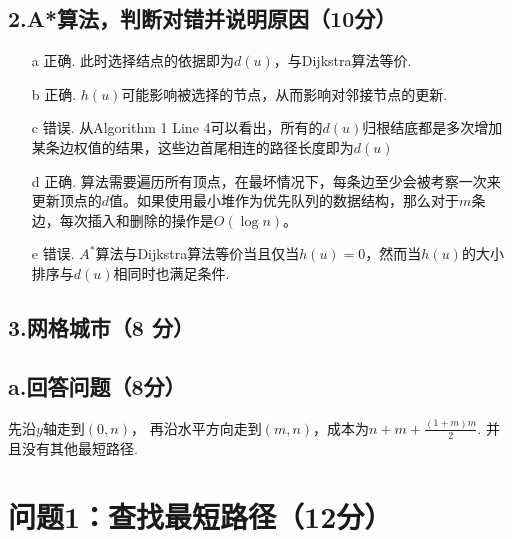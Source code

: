 \documentclass{article}
\begin{document}
\subsection*{2.A*算法，判断对错并说明原因（10分）}

\begin{enumerate}
    \item[a] 正确. 此时选择结点的依据即为$d(u)$，与Dijkstra算法等价.
    \item[b] 正确. $h(u)$可能影响被选择的节点，从而影响对邻接节点的更新.
    \item[c] 错误. 从Algorithm 1 Line 4可以看出，所有的$d(u)$归根结底都是多次增加某条边权值的结果，这些边首尾相连的路径长度即为$d(u)$
    \item[d] 正确. 算法需要遍历所有顶点，在最坏情况下，每条边至少会被考察一次来更新顶点的$d$值。如果使用最小堆作为优先队列的数据结构，那么对于$m$条边，每次插入和删除的操作是$O(\log n)$。
    \item[e] 错误. $A^*$算法与Dijkstra算法等价当且仅当$h(u)=0$，然而当$h(u)$的大小排序与$d(u)$相同时也满足条件.
\end{enumerate}

\subsection*{3.网格城市（8 分）}

\subsection*{a.回答问题（8分）}
先沿$y$轴走到$(0, n)$， 再沿水平方向走到$(m, n)$，成本为$n+m+\frac{\left(1+m\right)m}{2}$.
并且没有其他最短路径.



\section*{问题1：查找最短路径（12分）}
\end{document}
